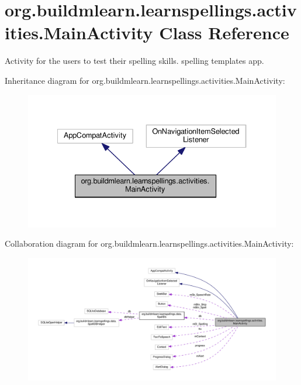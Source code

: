 \hypertarget{classorg_1_1buildmlearn_1_1learnspellings_1_1activities_1_1MainActivity}{}\section{org.\+buildmlearn.\+learnspellings.\+activities.\+Main\+Activity Class Reference}
\label{classorg_1_1buildmlearn_1_1learnspellings_1_1activities_1_1MainActivity}


Activity for the users to test their spelling skills. spelling template\textquotesingle{}s app.  




Inheritance diagram for org.\+buildmlearn.\+learnspellings.\+activities.\+Main\+Activity\+:
\nopagebreak
\begin{figure}[H]
\begin{center}
\leavevmode
\includegraphics[width=334pt]{classorg_1_1buildmlearn_1_1learnspellings_1_1activities_1_1MainActivity__inherit__graph}
\end{center}
\end{figure}


Collaboration diagram for org.\+buildmlearn.\+learnspellings.\+activities.\+Main\+Activity\+:
\nopagebreak
\begin{figure}[H]
\begin{center}
\leavevmode
\includegraphics[width=350pt]{classorg_1_1buildmlearn_1_1learnspellings_1_1activities_1_1MainActivity__coll__graph}
\end{center}
\end{figure}
